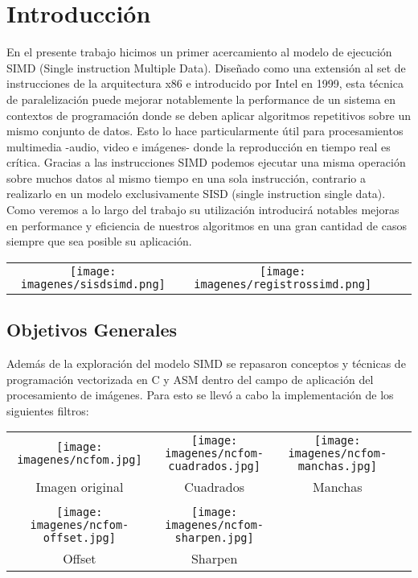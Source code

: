 \section{Introducción}
En el presente trabajo hicimos un primer acercamiento al modelo de ejecución SIMD (Single instruction Multiple Data). Diseñado como una extensión al set de instrucciones de la arquitectura x86 e introducido por Intel en 1999, esta técnica de paralelización puede mejorar notablemente la performance de un sistema en contextos de programación donde se deben aplicar algoritmos repetitivos sobre un mismo conjunto de datos. Esto lo hace particularmente útil para procesamientos multimedia -audio, video e imágenes- donde la reproducción en tiempo real es crítica. Gracias a las instrucciones SIMD podemos ejecutar una misma operación sobre muchos datos al mismo tiempo en una sola instrucción, contrario a realizarlo en un modelo exclusivamente SISD (single instruction single data). Como veremos a lo largo del trabajo su utilización introducirá notables mejoras en performance y eficiencia de nuestros algoritmos en una gran cantidad de casos siempre que sea posible su aplicación.

\begin{center}
  \begin{tabular}{cccc}
    \texttt{[image: imagenes/sisdsimd.png]} &
    \texttt{[image: imagenes/registrossimd.png]}\\
  \end{tabular}
 \end{center}

\subsection{Objetivos Generales}
Además de la exploración del modelo SIMD se repasaron conceptos y técnicas de programación vectorizada en C y ASM dentro del campo de aplicación del procesamiento de imágenes. Para esto se llevó a cabo la implementación de los siguientes filtros:

\begin{center}
 \begin{tabular}{cccc}
   \texttt{[image: imagenes/ncfom.jpg]} &
   \texttt{[image: imagenes/ncfom-cuadrados.jpg]} &
   \texttt{[image: imagenes/ncfom-manchas.jpg]} \\
   Imagen original & Cuadrados & Manchas \\
   \\
   \texttt{[image: imagenes/ncfom-offset.jpg]} &
   \texttt{[image: imagenes/ncfom-sharpen.jpg]} \\
   Offset & Sharpen \\
 \end{tabular}
\end{center}


